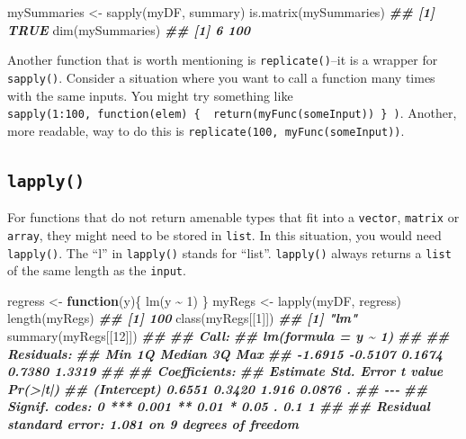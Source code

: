 \documentclass[
  12pt,
]{krantz}
\makeatletter
\newenvironment{Shaded}{\begin{snugshade}}{\end{snugshade}}
\newcommand{\ControlFlowTok}[1]{\textcolor[rgb]{0.27,0.27,0.27}{\textbf{#1}}}
\newcommand{\DecValTok}[1]{\textcolor[rgb]{0.06,0.06,0.06}{#1}}
\newcommand{\DocumentationTok}[1]{\textcolor[rgb]{0.37,0.37,0.37}{\textbf{\textit{#1}}}}
\newcommand{\FunctionTok}[1]{\textcolor[rgb]{0,0,0}{#1}}
\newcommand{\NormalTok}[1]{#1}
\newcommand{\OtherTok}[1]{\textcolor[rgb]{0.37,0.37,0.37}{#1}}
\newcommand{\SpecialCharTok}[1]{\textcolor[rgb]{0,0,0}{#1}}
\newenvironment{kframe}{%
\medskip{}
\setlength{\fboxsep}{.8em}
 \def\at@end@of@kframe{}%
 \ifinner\ifhmode%
  \def\at@end@of@kframe{\end{minipage}}%
  \begin{minipage}{\columnwidth}%
 \fi\fi%
 \def\FrameCommand##1{\hskip\@totalleftmargin \hskip-\fboxsep
 \colorbox{shadecolor}{##1}\hskip-\fboxsep
     \hskip-\linewidth \hskip-\@totalleftmargin \hskip\columnwidth}%
 \MakeFramed {\advance\hsize-\width
   \@totalleftmargin\z@ \linewidth\hsize
   \@setminipage}}%
 {\par\unskip\endMakeFramed%
 \at@end@of@kframe}
\renewenvironment{Shaded}{\begin{kframe}}{\end{kframe}}
\makeatother
\begin{document}
\begin{Shaded}
\begin{Highlighting}[]
\NormalTok{mySummaries }\OtherTok{\textless{}{-}} \FunctionTok{sapply}\NormalTok{(myDF, summary)}
\FunctionTok{is.matrix}\NormalTok{(mySummaries)}
\DocumentationTok{\#\# [1] TRUE}
\FunctionTok{dim}\NormalTok{(mySummaries)}
\DocumentationTok{\#\# [1]   6 100}
\end{Highlighting}
\end{Shaded}

Another function that is worth mentioning is \texttt{replicate()}--it is a wrapper for \texttt{sapply()}. Consider a situation where you want to call a function many times with the same inputs. You might try something like \texttt{sapply(1:100,\ function(elem)\ \{\ \ return(myFunc(someInput))\ \}\ )}. Another, more readable, way to do this is \texttt{replicate(100,\ myFunc(someInput))}.

\hypertarget{lapply}{%
\subsection{\texorpdfstring{\texttt{lapply()}}{lapply()}}\label{lapply}}

For functions that do not return amenable types that fit into a \texttt{vector}, \texttt{matrix} or \texttt{array}, they might need to be stored in \texttt{list}. In this situation, you would need \texttt{lapply()}. The ``l'' in \texttt{lapply()} stands for ``list''. \texttt{lapply()} always returns a \texttt{list} of the same length as the \texttt{input}.

\begin{Shaded}
\begin{Highlighting}[]
\NormalTok{regress }\OtherTok{\textless{}{-}} \ControlFlowTok{function}\NormalTok{(y)\{ }\FunctionTok{lm}\NormalTok{(y }\SpecialCharTok{\textasciitilde{}} \DecValTok{1}\NormalTok{) \}}
\NormalTok{myRegs }\OtherTok{\textless{}{-}} \FunctionTok{lapply}\NormalTok{(myDF, regress)}
\FunctionTok{length}\NormalTok{(myRegs)}
\DocumentationTok{\#\# [1] 100}
\FunctionTok{class}\NormalTok{(myRegs[[}\DecValTok{1}\NormalTok{]])}
\DocumentationTok{\#\# [1] "lm"}
\FunctionTok{summary}\NormalTok{(myRegs[[}\DecValTok{12}\NormalTok{]])}
\DocumentationTok{\#\# }
\DocumentationTok{\#\# Call:}
\DocumentationTok{\#\# lm(formula = y \textasciitilde{} 1)}
\DocumentationTok{\#\# }
\DocumentationTok{\#\# Residuals:}
\DocumentationTok{\#\#     Min      1Q  Median      3Q     Max }
\DocumentationTok{\#\# {-}1.6915 {-}0.5107  0.1674  0.7380  1.3319 }
\DocumentationTok{\#\# }
\DocumentationTok{\#\# Coefficients:}
\DocumentationTok{\#\#             Estimate Std. Error t value Pr(\textgreater{}|t|)  }
\DocumentationTok{\#\# (Intercept)   0.6551     0.3420   1.916   0.0876 .}
\DocumentationTok{\#\# {-}{-}{-}}
\DocumentationTok{\#\# Signif. codes:  0 \textquotesingle{}***\textquotesingle{} 0.001 \textquotesingle{}**\textquotesingle{} 0.01 \textquotesingle{}*\textquotesingle{} 0.05 \textquotesingle{}.\textquotesingle{} 0.1 \textquotesingle{} \textquotesingle{} 1}
\DocumentationTok{\#\# }
\DocumentationTok{\#\# Residual standard error: 1.081 on 9 degrees of freedom}
\end{Highlighting}
\end{Shaded}
\end{document}
